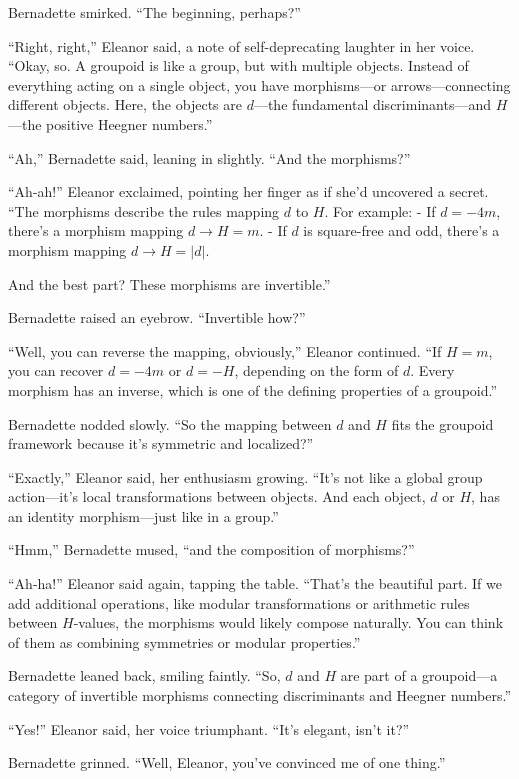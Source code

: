Bernadette smirked. “The beginning, perhaps?”

“Right, right,” Eleanor said, a note of self-deprecating laughter in her voice. “Okay, so. A groupoid is like a group, but with multiple objects. Instead of everything acting on a single object, you have morphisms—or arrows—connecting different objects. Here, the objects are \(d\)—the fundamental discriminants—and \(H\)—the positive Heegner numbers.”

“Ah,” Bernadette said, leaning in slightly. “And the morphisms?”

“Ah-ah!” Eleanor exclaimed, pointing her finger as if she’d uncovered a secret. “The morphisms describe the rules mapping \(d\) to \(H\). For example:
- If \(d = -4m\), there’s a morphism mapping \(d \to H = m\).
- If \(d\) is square-free and odd, there’s a morphism mapping \(d \to H = |d|.\)

And the best part? These morphisms are invertible.”

Bernadette raised an eyebrow. “Invertible how?”

“Well, you can reverse the mapping, obviously,” Eleanor continued. “If \(H = m\), you can recover \(d = -4m\) or \(d = -H\), depending on the form of \(d\). Every morphism has an inverse, which is one of the defining properties of a groupoid.”

Bernadette nodded slowly. “So the mapping between \(d\) and \(H\) fits the groupoid framework because it’s symmetric and localized?”

“Exactly,” Eleanor said, her enthusiasm growing. “It’s not like a global group action—it’s local transformations between objects. And each object, \(d\) or \(H\), has an identity morphism—just like in a group.”

“Hmm,” Bernadette mused, “and the composition of morphisms?”

“Ah-ha!” Eleanor said again, tapping the table. “That’s the beautiful part. If we add additional operations, like modular transformations or arithmetic rules between \(H\)-values, the morphisms would likely compose naturally. You can think of them as combining symmetries or modular properties.”

Bernadette leaned back, smiling faintly. “So, \(d\) and \(H\) are part of a groupoid—a category of invertible morphisms connecting discriminants and Heegner numbers.”

“Yes!” Eleanor said, her voice triumphant. “It’s elegant, isn’t it?”

Bernadette grinned. “Well, Eleanor, you’ve convinced me of one thing.”


